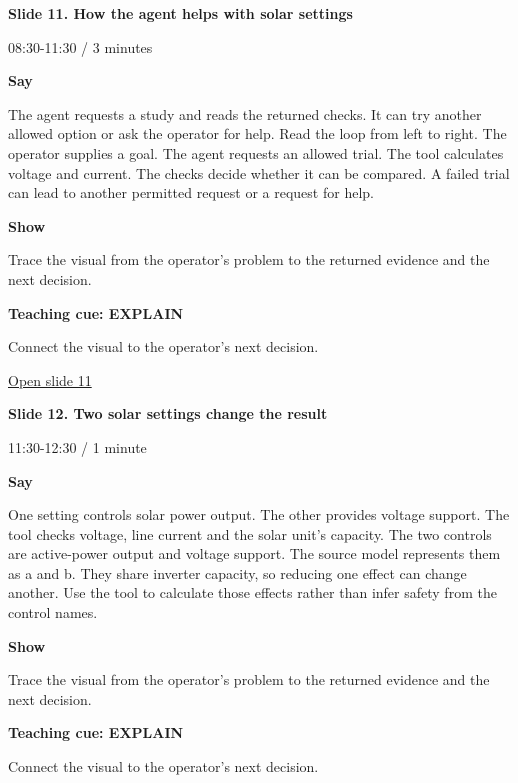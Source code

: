 \documentclass[12pt,letterpaper]{article}
\begin{document}
\clearpage{}
{\Large\bfseries\color{IEEEBlue} Slide 11. How the agent helps with solar settings\par}\medskip
{\small\color{Slate} 08:30-11:30 /\allowbreak{} 3 minutes\par}\medskip
\textbf{Say}\par The agent requests a study and reads the returned checks. It can try another allowed option or ask the operator for help. Read the loop from left to right. The operator supplies a goal. The agent requests an allowed trial. The tool calculates voltage and current. The checks decide whether it can be compared. A failed trial can lead to another permitted request or a request for help.\par\medskip
\textbf{Show}\par Trace the visual from the operator's problem to the returned evidence and the next decision.\par\medskip
\textbf{Teaching cue: EXPLAIN}\par Connect the visual to the operator's next decision.\par\medskip
\vfill\href{https://alaaselim-sudo.github.io/GridGuard-Agentic-AI-Tutorials/operator-cases/#/11}{Open slide 11}\par
\clearpage{}
{\Large\bfseries\color{IEEEBlue} Slide 12. Two solar settings change the result\par}\medskip
{\small\color{Slate} 11:30-12:30 /\allowbreak{} 1 minute\par}\medskip
\textbf{Say}\par One setting controls solar power output. The other provides voltage support. The tool checks voltage, line current and the solar unit's capacity. The two controls are active-power output and voltage support. The source model represents them as a and b. They share inverter capacity, so reducing one effect can change another. Use the tool to calculate those effects rather than infer safety from the control names.\par\medskip
\textbf{Show}\par Trace the visual from the operator's problem to the returned evidence and the next decision.\par\medskip
\textbf{Teaching cue: EXPLAIN}\par Connect the visual to the operator's next decision.\par\medskip
\end{document}

